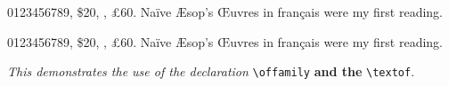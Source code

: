 \documentclass{minimal}
\begin{document}
{\selectfont

0123456789, \$20, , \pounds60.  Na\"ive
\AE sop's \OE uvres in fran\c cais were my first reading.
\lipsum[1]}


{\selectfont

0123456789, \$20, , \pounds60.  Na\"ive
\AE sop's \OE uvres in fran\c cais were my first reading.
\lipsum[2]}

\emph{This demonstrates the use of the {\offamily declaration}}
    \verb|\offamily|
  \textbf{and the } \verb|\textof|. 
\end{document}
